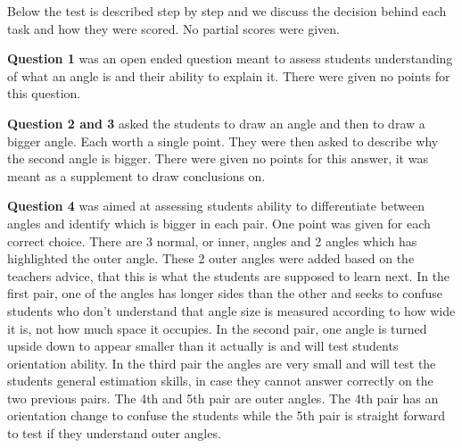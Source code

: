 
\bigskip\noindent
Below the test is described step by step and we discuss the decision behind each task and how they were scored. No partial scores were given.

\bigskip\noindent
\textbf{Question 1} was an open ended question meant to assess students understanding of what an angle is and their ability to explain it. There were given no points for this question.

\bigskip\noindent
\textbf{Question 2 and 3} asked the students to draw an angle and then to draw a bigger angle. Each worth a single point. They were then asked to describe why the second angle is bigger. There were given no points 
for this answer, it was meant as a supplement to draw conclusions on.

\bigskip\noindent
\textbf{Question 4} was aimed at assessing students ability to differentiate between angles and identify which is bigger in each pair. One point was given for each correct choice. There are 3 normal, or inner, angles and 2 angles which has highlighted the outer angle. These 2 outer angles were added based on the teachers advice, that this is what the students are supposed to learn next. In the first pair, one of the angles has longer sides than the other and seeks to confuse students who don't understand that angle size is measured according to how wide it is, not how much space it occupies. In the second pair, one angle is turned upside down to appear smaller than it actually is and will test students orientation ability. In the third pair the angles are very small and will test the students general estimation skills, in case they cannot answer correctly on the two previous pairs. The 4th and 5th pair are outer angles. The 4th pair has an orientation change to confuse the students while the 5th pair is straight forward to test if they understand outer angles. 

